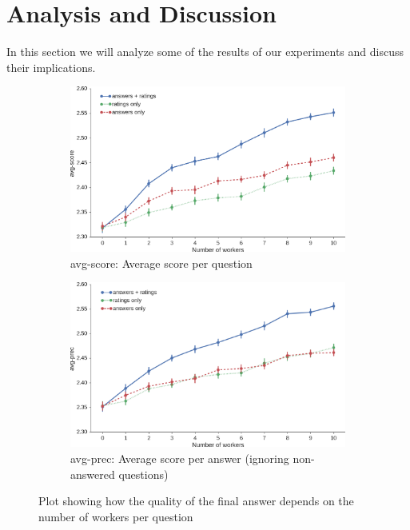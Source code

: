 \documentclass[letterpaper]{article}
\begin{document}
\section{Analysis and Discussion}
\label{sec:analysis}

In this section we will analyze some of the results of our experiments and discuss their implications.

\begin{figure}[h!t]
	\begin{subfigure}[t]{0.48\textwidth}
		\centering
		\includegraphics[width=\textwidth]{img/nworkers_vs_accuracy}
		\caption{avg-score: Average score per question}
		\label{fig:nworkers_vs_accuracy}
	\end{subfigure}
	\begin{subfigure}[t]{0.48\textwidth}
		\centering
		\includegraphics[width=\textwidth]{img/nworkers_vs_precision}
		\caption{avg-prec: Average score per answer (ignoring non-answered questions)}
		\label{fig:nworkers_vs_precision}
	\end{subfigure}
	\caption{Plot showing how the quality of the final answer depends on the number of workers per question}
	\label{fig:nworkers_vs_quality}
\end{figure}
\end{document}
